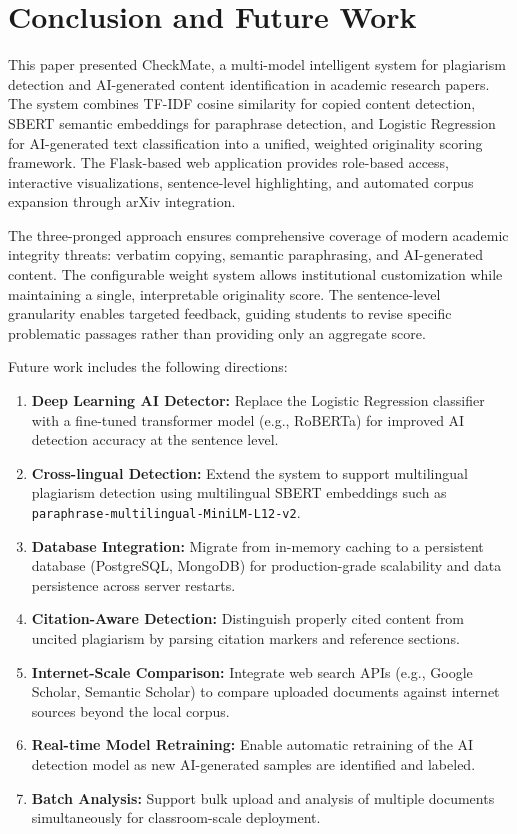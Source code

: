 \documentclass[conference]{IEEEtran}
\begin{document}
\section{Conclusion and Future Work}

This paper presented CheckMate, a multi-model intelligent system for plagiarism detection and AI-generated content identification in academic research papers. The system combines TF-IDF cosine similarity for copied content detection, SBERT semantic embeddings for paraphrase detection, and Logistic Regression for AI-generated text classification into a unified, weighted originality scoring framework. The Flask-based web application provides role-based access, interactive visualizations, sentence-level highlighting, and automated corpus expansion through arXiv integration.

The three-pronged approach ensures comprehensive coverage of modern academic integrity threats: verbatim copying, semantic paraphrasing, and AI-generated content. The configurable weight system allows institutional customization while maintaining a single, interpretable originality score. The sentence-level granularity enables targeted feedback, guiding students to revise specific problematic passages rather than providing only an aggregate score.

Future work includes the following directions:

\begin{enumerate}
\item \textbf{Deep Learning AI Detector:} Replace the Logistic Regression classifier with a fine-tuned transformer model (e.g., RoBERTa) for improved AI detection accuracy at the sentence level.

\item \textbf{Cross-lingual Detection:} Extend the system to support multilingual plagiarism detection using multilingual SBERT embeddings such as \texttt{paraphrase-multilingual-MiniLM-L12-v2}.

\item \textbf{Database Integration:} Migrate from in-memory caching to a persistent database (PostgreSQL, MongoDB) for production-grade scalability and data persistence across server restarts.

\item \textbf{Citation-Aware Detection:} Distinguish properly cited content from uncited plagiarism by parsing citation markers and reference sections.

\item \textbf{Internet-Scale Comparison:} Integrate web search APIs (e.g., Google Scholar, Semantic Scholar) to compare uploaded documents against internet sources beyond the local corpus.

\item \textbf{Real-time Model Retraining:} Enable automatic retraining of the AI detection model as new AI-generated samples are identified and labeled.

\item \textbf{Batch Analysis:} Support bulk upload and analysis of multiple documents simultaneously for classroom-scale deployment.
\end{enumerate}
\end{document}
